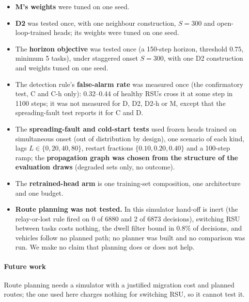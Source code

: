 \begin{itemize}
\item \textbf{M's weights} were tuned on one seed.
\item \textbf{D2} was tested once, with one neighbour construction, $S=300$ and open-loop-trained heads; its weights were tuned on one seed.
\item The \textbf{horizon objective} was tested once (a 150-step horizon, threshold $0.75$, minimum 5 tasks), under staggered onset $S=300$, with one D2 construction and weights tuned on one seed.
\item The detection rule's \textbf{false-alarm rate} was measured once (the confirmatory test, C and C-h only): 0.32--0.44 of healthy RSUs cross it at some step in 1100 steps; it was not measured for D, D2, D2-h or M, except that the spreading-fault test reports it for C and D.
\item The \textbf{spreading-fault and cold-start tests} used frozen heads trained on simultaneous onset (out of distribution by design), one scenario of each kind, lags $L\in\{0,20,40,80\}$, restart fractions $\{0.10,0.20,0.40\}$ and a 100-step ramp; the \textbf{propagation graph was chosen from the structure of the evaluation draws} (degraded sets only, no outcome).
\item The \textbf{retrained-head arm} is one training-set composition, one architecture and one budget.
\item \textbf{Route planning was not tested.} In this simulator hand-off is inert (the relay-or-lost rule fired on 0 of 6880 and 2 of 6873 decisions), switching RSU between tasks costs nothing, the dwell filter bound in 0.8\% of decisions, and vehicles follow no planned path; no planner was built and no comparison was run. We make no claim that planning does or does not help.
\end{itemize}

\paragraph*{Future work}
Route planning needs a simulator with a justified migration cost and planned routes; the one used here charges nothing for switching RSU, so it cannot test it.

